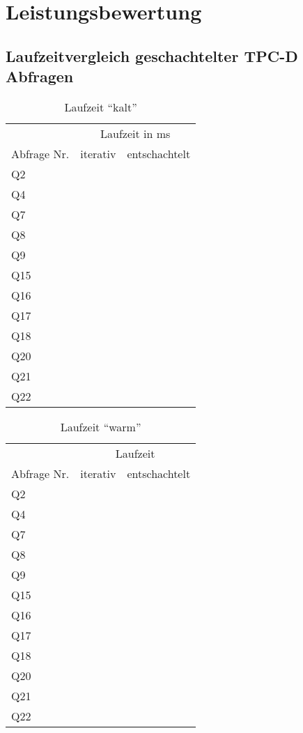 %
%
%

\chapter{Leistungsbewertung}

\section[Laufzeitvergleich]{Laufzeitvergleich geschachtelter TPC-D Abfragen}
\begin{table}[ht]
\centering
\begin{tabular}{@{}lrr@{}} \toprule
& \multicolumn{2}{c}{Laufzeit in ms} \\ \cmidrule(l){2-3}
Abfrage Nr. & iterativ & entschachtelt\\ \midrule
Q2 & & \\
Q4 & & \\
Q7 & & \\
Q8 & & \\
Q9 & & \\
Q15 & & \\
Q16 & & \\
Q17 & & \\
Q18 & & \\
Q20 & & \\
Q21 & & \\
Q22 & & \\ \bottomrule
\end{tabular}
  \caption{Laufzeit \enquote{kalt}}
  \label{tab_runtime_with_selectivity}
\end{table}

\begin{table}[ht]
\centering
\begin{tabular}{@{}lrr@{}} \toprule
& \multicolumn{2}{c}{Laufzeit} \\ \cmidrule(l){2-3}
Abfrage Nr. & iterativ & entschachtelt\\ \midrule
Q2 & & \\
Q4 & & \\
Q7 & & \\
Q8 & & \\
Q9 & & \\
Q15 & & \\
Q16 & & \\
Q17 & & \\
Q18 & & \\
Q20 & & \\
Q21 & & \\
Q22 & & \\ \bottomrule
\end{tabular}
  \caption{Laufzeit \enquote{warm}}
  \label{tab_runtime}
\end{table}


%
%
%